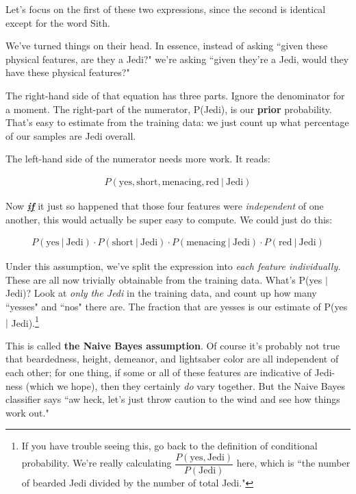 \documentclass[12pt]{article}
\begin{document}
Let's focus on the first of these two expressions, since the second is
identical except for the word Sith.

We've turned things on their head. In essence, instead of asking ``given these
physical features, are they a Jedi?" we're asking ``given they're a Jedi,
would they have these physical features?" 

The right-hand side of that equation has three parts. Ignore the denominator
for a moment. The right-part of the numerator, P(Jedi), is our \textbf{prior}
probability. That's easy to estimate from the training data: we just count up
what percentage of our samples are Jedi overall.

The left-hand side of the numerator needs more work. It reads:

\vspace{-.2in}
\begin{align*}
P(\textrm{yes}, \textrm{short}, \textrm{menacing}, \textrm{red} \ | \ \textrm{Jedi}) 
\end{align*}

Now \textbf{\textit{\underline{if}}} it just so happened that those four
features were \textit{independent} of one another, this would actually be
super easy to compute. We could just do this:

\vspace{-.2in}
\begin{align*}
P(\textrm{yes} \ |\ \textrm{Jedi}) \cdot
P(\textrm{short} \ |\ \textrm{Jedi}) \cdot
P(\textrm{menacing} \ |\ \textrm{Jedi}) \cdot
P(\textrm{red} \ |\ \textrm{Jedi})
\end{align*}

Under this assumption, we've split the expression into \textit{each feature
individually.} These are all now trivially obtainable from the training data.
What's P(yes $|$ Jedi)? Look at \textit{only the Jedi} in the training data,
and count up how many ``yesses" and ``nos" there are. The fraction that are
yesses is our estimate of P(yes $|$ Jedi).\footnote{If you have trouble seeing
this, go back to the definition of conditional probability. We're really
calculating $\dfrac{P(\textrm{yes},\textrm{Jedi})}{P(\textrm{Jedi})}$ here,
which is ``the number of bearded Jedi divided by the number of total Jedi."}

This is called \textbf{the Naive Bayes assumption}. Of course it's probably
not true that beardedness, height, demeanor, and lightsaber color are all
independent of each other; for one thing, if some or all of these features are
indicative of Jedi-ness (which we hope), then they certainly \textit{do} vary
together. But the Naive Bayes classifier says ``aw heck, let's just throw
caution to the wind and see how things work out."
\end{document}
